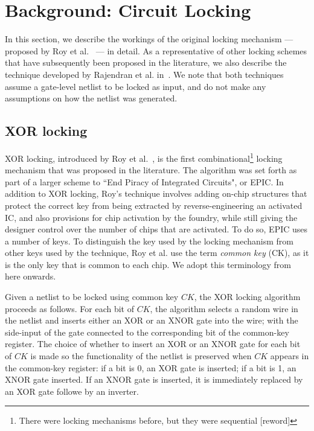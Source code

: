 \section{Background: Circuit Locking}

In this section, we describe the workings of the original locking mechanism --- proposed by Roy et al.~\cite{roy2008epic} --- in detail. As a representative of other locking schemes that have subsequently been proposed in the literature, we also describe the technique developed by Rajendran et al. in~\cite{rajendran2012logic}. We note that both techniques assume a gate-level netlist to be locked as input, and do not make any assumptions on how the netlist was generated. %

\subsection{XOR locking~\cite{roy2008epic}}
XOR locking, introduced by Roy et al.~\cite{roy2008epic}, is the first combinational\footnote{There were locking mechanisms before, but they were sequential [reword]} locking mechanism that was proposed in the literature. The algorithm was set forth as part of a larger scheme to ``End Piracy of Integrated Circuits", or EPIC. In addition to XOR locking, Roy's technique involves adding on-chip structures that protect the correct key from being extracted by reverse-engineering an activated IC, and also provisions for chip activation by the foundry, while still giving the designer control over the number of chips that are activated. To do so, EPIC uses a number of keys. To distinguish the key used by the locking mechanism from other keys used by the technique, Roy et al. use the term \emph{common key} (CK), as it is the only key that is common to each chip. We adopt this terminology from here onwards.


Given a netlist to be locked using common key $CK$, the XOR locking algorithm proceeds as follows. For each bit of $CK$, the algorithm selects a random wire in the netlist and inserts either an XOR or an XNOR gate into the wire; with the side-input of the gate connected to the corresponding bit of the common-key register. The choice of whether to insert an XOR or an XNOR gate for each bit of $CK$ is made so the functionality of the netlist is preserved when $CK$ appears in the common-key register: if a bit is 0, an XOR gate is inserted; if a bit is 1, an XNOR gate inserted. If an XNOR gate is inserted, it is immediately replaced by an XOR gate followe by an inverter. 

